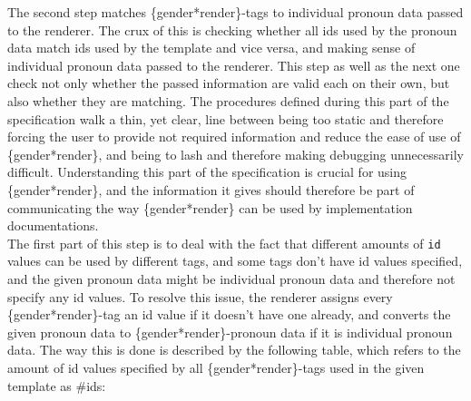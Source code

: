 \documentclass{article}
\begin{document}
    The second step matches \{gender*render\}-tags to individual pronoun data passed to the renderer.
    The crux of this is checking whether all ids used by the pronoun data match ids used by the template and vice versa, and making sense of individual pronoun data passed to the renderer.
    This step as well as the next one check not only whether the passed information are valid each on their own, but also whether they are matching.
    The procedures defined during this part of the specification walk a thin, yet clear, line between being too static and therefore forcing the user to provide not required information and reduce the ease of use of \{gender*render\}, and being to lash and therefore making debugging unnecessarily difficult.
    Understanding this part of the specification is crucial for using \{gender*render\}, and the information it gives should therefore be part of communicating the way \{gender*render\} can be used by implementation documentations.\\

    The first part of this step is to deal with the fact that different amounts of \texttt{id} values can be used by different tags, and some tags don't have id values specified, and the given pronoun data might be individual pronoun data and therefore not specify any id values.
    To resolve this issue, the renderer assigns every \{gender*render\}-tag an id value if it doesn't have one already, and converts the given pronoun data to \{gender*render\}-pronoun data if it is individual pronoun data.
    The way this is done is described by the following table, which refers to the amount of id values specified by all \{gender*render\}-tags used in the given template as \#ids:
\end{document}
